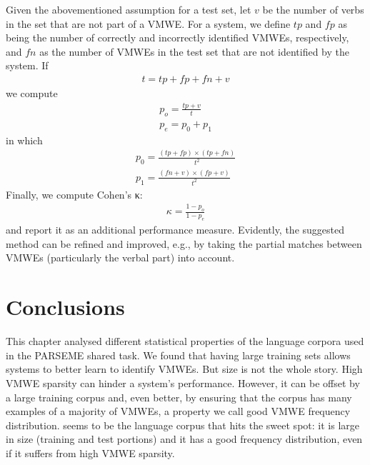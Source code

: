 \documentclass[output=paper,modfonts,nonflat,draftmode]{langsci/langscibook}
\begin{document}
Given the abovementioned assumption for a test set, let $v$ be the number of verbs in the set that are not part of a VMWE. For a system, we define $tp$ and $fp$ as being the number of correctly and incorrectly identified VMWEs, respectively, and $fn$ as the number of VMWEs in the test set that are not identified by the system. If 
\begin{align*}
t= tp + fp + fn + v
\end{align*} 
we compute 
\begin{align*}
p_o=\frac{tp+v}{t}\\
p_e = p_0 + p_1
\end{align*}
in which
\begin{align*}
p_0 =\frac{(tp+fp)\times(tp+fn)}{t^2}\\
p_1 =\frac{(fn+v)\times(fp+v)}{t^2} 
\end{align*}
Finally, we compute Cohen's κ:
\begin{align*}
\kappa = \frac{1-p_o}{1-p_e}
\end{align*}
and report it as an additional performance measure. Evidently, the suggested method can be refined and improved, e.g., by taking the partial matches between VMWEs (particularly the verbal part) into account.




\section{Conclusions}
\label{conclude}

This chapter analysed different statistical properties of the language corpora used in the PARSEME shared task. We found that having large training sets allows systems to better learn to identify VMWEs. But size is not the whole story. High VMWE sparsity can hinder a system's performance. However, it can be offset by a large training corpus and, even better, by ensuring that the corpus has many examples of a majority of VMWEs, a property we call good VMWE frequency distribution.  seems to be the language corpus that hits the sweet spot: it is large in size (training and test portions) and it has a good frequency distribution, even if it suffers from high VMWE sparsity. 
\end{document}
